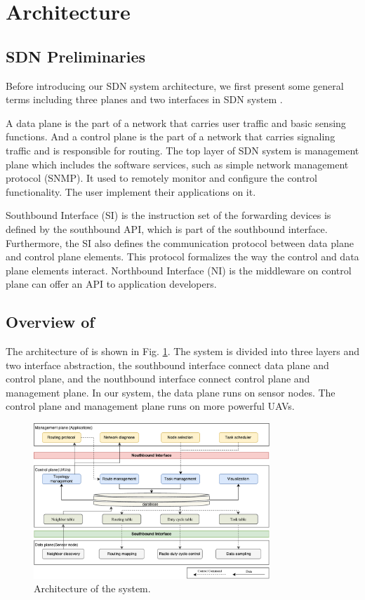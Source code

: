 \section{Architecture}
\label{Arc}
\subsection{SDN Preliminaries}
Before introducing our SDN system architecture, we first present some general terms including three planes and two interfaces in SDN system \cite{kreutz2015software}.

A data plane is the part of a network that carries user traffic and basic sensing functions. And a control plane is the part of a network that carries signaling traffic and is responsible for routing. The top layer of SDN system is management plane which includes the software services, such as simple network management protocol (SNMP). It used to remotely monitor and configure the control functionality. The user implement their applications on it.

Southbound Interface (SI) is the instruction set of the forwarding devices is defined by the southbound API, which is part of the southbound interface. Furthermore, the SI also defines the communication protocol between data plane and control plane elements. This protocol formalizes the way the control and data plane elements interact. Northbound Interface (NI) is the middleware on control plane can offer an API to application developers.

\subsection{Overview of {\sdn}}
The architecture of {\sdn} is shown in Fig. \ref{Architecture}. 
The system is divided into three layers and two interface abstraction, the southbound interface connect data plane and control plane, and the nouthbound interface connect control plane and management plane. In our system, the data plane runs on sensor nodes. The control plane and management plane runs on more powerful UAVs.
\begin{figure}[htbp]
	\centering
	\includegraphics[width=3.5in]{./Figure/Architecture}
	\caption{Architecture of the system.}
	\label{Architecture}
\end{figure}

